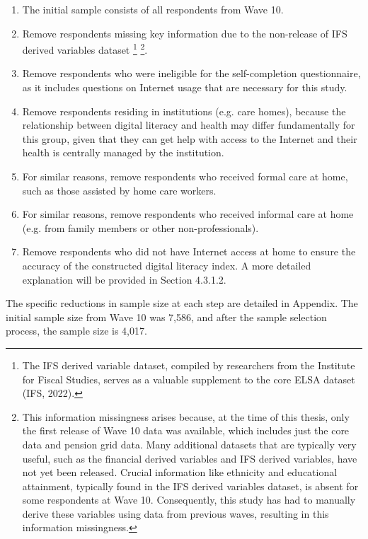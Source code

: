 \begin{enumerate}
    \item The initial sample consists of all respondents from Wave 10.
    \item Remove respondents missing key information due to the non-release of IFS derived variables dataset \footnote{The IFS derived variable dataset, compiled by researchers from the Institute for Fiscal Studies, serves as a valuable supplement to the core ELSA dataset (IFS, 2022).} \footnote{This information missingness arises because, at the time of this thesis, only the first release of Wave 10 data was available, which includes just the core data and pension grid data. Many additional datasets that are typically very useful, such as the financial derived variables and IFS derived variables, have not yet been released. Crucial information like ethnicity and educational attainment, typically found in the IFS derived variables dataset, is absent for some respondents at Wave 10. Consequently, this study has had to manually derive these variables using data from previous waves, resulting in this information missingness.}.
    \item Remove respondents who were ineligible for the self-completion questionnaire, as it includes questions on Internet usage that are necessary for this study.
    \item Remove respondents residing in institutions (e.g. care homes), because the relationship between digital literacy and health may differ fundamentally for this group, given that they can get help with access to the Internet and their health is centrally managed by the institution.
    \item For similar reasons, remove respondents who received formal care at home, such as those assisted by home care workers.
    \item For similar reasons, remove respondents who received informal care at home (e.g. from family members or other non-professionals).
    \item Remove respondents who did not have Internet access at home to ensure the accuracy of the constructed digital literacy index. A more detailed explanation will be provided in Section 4.3.1.2.
\end{enumerate}

The specific reductions in sample size at each step are detailed in Appendix. The initial sample size from Wave 10 was 7,586, and after the sample selection process, the sample size is 4,017.


